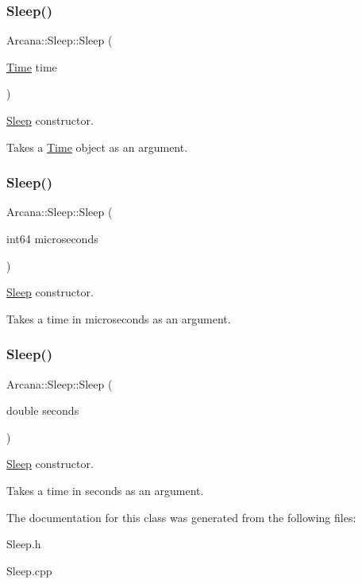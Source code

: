 \subsubsection{\texorpdfstring{Sleep()}{Sleep()}\hspace{0.1cm}{\footnotesize\ttfamily [1/3]}}
{\footnotesize\ttfamily Arcana\+::\+Sleep\+::\+Sleep (\begin{DoxyParamCaption}\item[{\mbox{\hyperlink{class_arcana_1_1_time}{Time}}}]{time }\end{DoxyParamCaption})}



\mbox{\hyperlink{class_arcana_1_1_sleep}{Sleep}} constructor. 

Takes a \mbox{\hyperlink{class_arcana_1_1_time}{Time}} object as an argument. \mbox{\label{class_arcana_1_1_sleep_a5fc0c3cb0108e59f517a6ec13eb2d9e5}} 
\subsubsection{\texorpdfstring{Sleep()}{Sleep()}\hspace{0.1cm}{\footnotesize\ttfamily [2/3]}}
{\footnotesize\ttfamily Arcana\+::\+Sleep\+::\+Sleep (\begin{DoxyParamCaption}\item[{int64}]{microseconds }\end{DoxyParamCaption})}



\mbox{\hyperlink{class_arcana_1_1_sleep}{Sleep}} constructor. 

Takes a time in microseconds as an argument. \mbox{\label{class_arcana_1_1_sleep_aa483019d78bd041cddda7b781671b971}} 
\subsubsection{\texorpdfstring{Sleep()}{Sleep()}\hspace{0.1cm}{\footnotesize\ttfamily [3/3]}}
{\footnotesize\ttfamily Arcana\+::\+Sleep\+::\+Sleep (\begin{DoxyParamCaption}\item[{double}]{seconds }\end{DoxyParamCaption})}



\mbox{\hyperlink{class_arcana_1_1_sleep}{Sleep}} constructor. 

Takes a time in seconds as an argument. 

The documentation for this class was generated from the following files\+:\begin{DoxyCompactItemize}
\item 
Sleep.\+h\item 
Sleep.\+cpp\end{DoxyCompactItemize}
